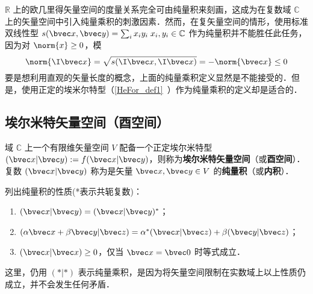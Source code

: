 
\begin{issues}
\issueTODO
\end{issues}

$\mathbb{R}$ 上的欧几里得矢量空间的度量关系完全可由纯量积来刻画，这成为在复数域 $\mathbb{C}$ 上的矢量空间中引入纯量乘积的刺激因素．然而，在复矢量空间的情形，使用标准双线性型 $s(\bvec x,\bvec y)=\sum_{i}x_iy_i\;x_i,y_i\in\mathbb{C}$ 作为纯量积并不能胜任此任务，因为对 $\norm{x}\geq0$，模
\begin{equation}
\norm{\I\bvec x}=\sqrt{s(\I\bvec x,\I\bvec x)}=-\norm{\bvec x}\leq0
\end{equation}
要是想利用直观的矢量长度的概念，上面的纯量乘积定义显然是不能接受的．但是，使用正定的埃米尔特型（\autoref{HeFor_def1}~）作为纯量乘积的定义却是适合的．
\subsection{埃尔米特矢量空间（酉空间）}
\begin{definition}{}\label{HVorUV_def1}
域 $\mathbb{C}$ 上一个有限维矢量空间 $V$ 配备一个正定埃尔米特型$(\bvec x|\bvec y):=f(\bvec x|\bvec y)$，则称为\textbf{埃尔米特矢量空间}（或\textbf{酉空间}）．复数 $(\bvec x|\bvec y)$ 称为是矢量 $\bvec x,\bvec y\in V$ 的\textbf{纯量积}（或\textbf{内积}）．
\end{definition}
列出纯量积的性质(*表示共轭复数)：
\begin{enumerate}
\item $(\bvec x|\bvec y)=(\bvec x|\bvec y)^*$；
\item $(\alpha\bvec x+\beta\bvec y|\bvec z)=\alpha^*(\bvec x|\bvec z)+\beta(\bvec y|\bvec z)$；
\item $(\bvec x|\bvec x)\geq0$，仅当 $\bvec x=\bvec 0$ 时等式成立．
\end{enumerate}

这里，仍用 $(*|*)$ 表示纯量乘积，是因为将矢量空间限制在实数域上以上性质仍成立，并不会发生任何矛盾．

